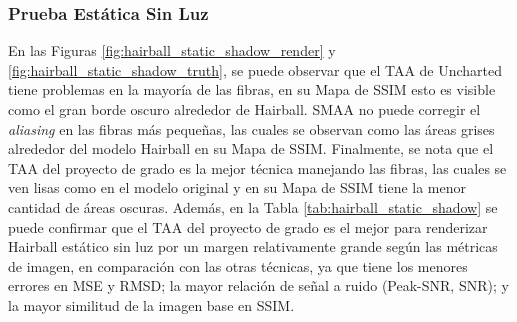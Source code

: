 \documentclass[pregrado]{tesis-usb} %
\begin{document}
\subsubsection{Prueba Estática Sin Luz}
En las Figuras \ref{fig:hairball_static_shadow_render} y \ref{fig:hairball_static_shadow_truth}, se puede observar que el TAA de Uncharted tiene problemas en la mayoría de las fibras, en su Mapa de SSIM esto es visible como el gran borde oscuro alrededor de Hairball. SMAA no puede corregir el \textit{aliasing} en las fibras más pequeñas, las cuales se observan como las áreas grises alrededor del modelo Hairball en su Mapa de SSIM. Finalmente, se nota que el TAA del proyecto de grado es la mejor técnica manejando las fibras, las cuales se ven lisas como en el modelo original y en su Mapa de SSIM tiene la menor cantidad de áreas oscuras. Además, en la Tabla \ref{tab:hairball_static_shadow} se puede confirmar que el TAA del proyecto de grado es el mejor para renderizar Hairball estático sin luz por un margen relativamente grande según las métricas de imagen, en comparación con las otras técnicas, ya que tiene los menores errores en MSE y RMSD; la mayor relación de señal a ruido (Peak-SNR, SNR); y la mayor similitud de la imagen base en SSIM. 
\end{document}
